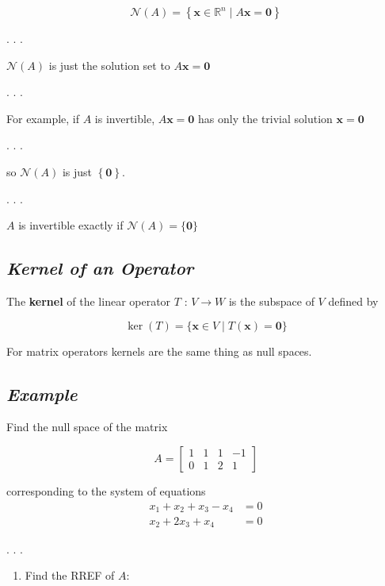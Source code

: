\documentclass[
  letterpaper,
  DIV=11,
  numbers=noendperiod]{scrartcl}
\providecommand{\tightlist}{%
  \setlength{\itemsep}{0pt}\setlength{\parskip}{0pt}}\usepackage{longtable,booktabs,array}
\begin{document}
\[
\mathcal{N}(A)=\left\{\mathbf{x} \in \mathbb{R}^{n} \mid A \mathbf{x}=\mathbf{0}\right\}
\]

. . .

\(\mathcal{N}(A)\) is just the solution set to
\(A \mathbf{x}=\mathbf{0}\)

. . .

For example, if \(A\) is invertible, \(A \mathbf{x}=\mathbf{0}\) has
only the trivial solution \(\mathbf{x}=\mathbf{0}\)

. . .

so \(\mathcal{N}(A)\) is just \(\left\{\mathbf{0}\right\}\).

. . .

\(A\) is invertible exactly if \(\mathcal{N}(A)=\{\mathbf{0}\}\)

\subsection{\texorpdfstring{\emph{Kernel of an
Operator}}{Kernel of an Operator}}\label{kernel-of-an-operator}

The \textbf{kernel} of the linear operator \(T\) : \(V \rightarrow W\)
is the subspace of \(V\) defined by

\[
\operatorname{ker}(T)=\{\mathbf{x} \in V \mid T(\mathbf{x})=\mathbf{0}\}
\]

For matrix operators kernels are the same thing as null spaces.

\subsection{\texorpdfstring{\emph{Example}}{Example}}\label{example}

Find the null space of the matrix

\[
A=\left[\begin{array}{rrrr}
1 & 1 & 1 & -1 \\
0 & 1 & 2 & 1 
\end{array}\right]
\]

corresponding to the system of equations \[
\begin{aligned}
x_{1}+x_{2}+x_{3}-x_{4} & =0 \\
x_{2}+2 x_{3}+x_{4} & =0
\end{aligned}
\]

. . .

\begin{enumerate}
\def\labelenumi{\arabic{enumi}.}
\tightlist
\item
  Find the RREF of \(A\):
\end{enumerate}
\end{document}
